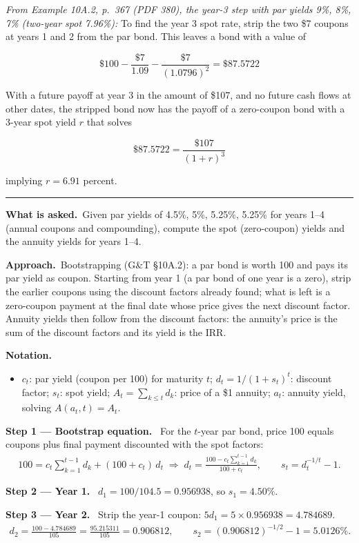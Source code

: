 \documentclass[11pt,a4paper]{article}
\newcommand{\notation}{\par\noindent\textbf{Notation.}}
\newcommand{\step}[2]{\par\medskip\noindent\textbf{Step #1 --- #2.}~}
\newcommand{\asked}{\par\medskip\noindent\textbf{What is asked.}~}
\newcommand{\approach}{\par\smallskip\noindent\textbf{Approach.}~}
\newcommand{\stmtend}{\par\endgroup\nopagebreak\noindent\rule{\linewidth}{0.4pt}\par\medskip}
\begin{document}
\emph{From Example 10A.2, p.~367 (PDF 380), the year-3 step with par yields 9\%, 8\%, 7\% (two-year
spot 7.96\%):} To find the year 3 spot rate, strip the two \$7 coupons at years 1 and 2 from the par
bond. This leaves a bond with a value of

\[\$100 - \frac{\$7}{1.09} - \frac{\$7}{(1.0796)^2} = \$87.5722\]

With a future payoff at year 3 in the amount of \$107, and no future cash flows at other dates, the
stripped bond now has the payoff of a zero-coupon bond with a 3-year spot yield \(r\) that solves

\[\$87.5722 = \frac{\$107}{(1+r)^3}\]

implying \(r = 6.91\) percent.
\stmtend

\asked Given par yields of 4.5\%, 5\%, 5.25\%, 5.25\% for years 1--4 (annual coupons and compounding), compute the spot (zero-coupon) yields
and the annuity yields for years 1--4.

\approach Bootstrapping (G\&T \S10A.2): a par bond is worth 100 and pays its par yield as coupon. Starting from year 1 (a par bond
of one year is a zero), strip the earlier coupons using the discount factors already found; what is left is a zero-coupon payment
at the final date whose price gives the next discount factor. Annuity yields then follow from the discount factors: the
annuity's price is the sum of the discount factors and its yield is the IRR.

\notation
\begin{itemize}
  \item $c_t$: par yield (coupon per 100) for maturity $t$; $d_t=1/(1+s_t)^t$: discount factor; $s_t$: spot yield; $A_t=\sum_{k\le t}d_k$: price of a \$1 annuity; $a_t$: annuity yield, solving $A(a_t,t)=A_t$.
\end{itemize}

\step{1}{Bootstrap equation} For the $t$-year par bond, price 100 equals coupons plus final payment discounted with the
spot factors:
\begin{align}
  100 = c_t\sum_{k=1}^{t-1}d_k + (100+c_t)\,d_t \;\Longrightarrow\; d_t = \frac{100-c_t\sum_{k=1}^{t-1}d_k}{100+c_t},\qquad s_t = d_t^{-1/t}-1. \label{r2be13-boot}
\end{align}

\step{2}{Year 1} $d_1 = 100/104.5 = 0.956938$, so $s_1=4.50\%$.

\step{3}{Year 2} Strip the year-1 coupon: $5d_1=5\times0.956938=4.784689$.
\begin{align}
  d_2 = \frac{100-4.784689}{105} = \frac{95.215311}{105} = 0.906812,\qquad s_2 = (0.906812)^{-1/2}-1 = 5.0126\%. \label{r2be13-2}
\end{align}
\end{document}
